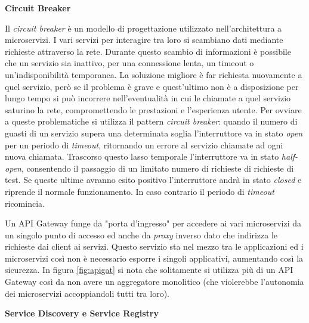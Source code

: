 \begin{flushleft}
\textbf{{\large Circuit Breaker}}
\end{flushleft}

Il \textit{circuit breaker} è un modello di progettazione utilizzato nell'architettura a microservizi. I vari servizi per interagire tra loro si scambiano dati mediante richieste attraverso la rete. Durante questo scambio di informazioni è possibile che un servizio sia inattivo, per una connessione lenta, un timeout o un'indisponibilità temporanea. La soluzione migliore è far richiesta nuovamente a quel servizio, però se il problema è grave e quest'ultimo non è a disposizione per lungo tempo si può incorrere nell'eventualità in cui le chiamate a quel servizio saturino la rete, compromettendo le prestazioni e l'esperienza utente. Per ovviare a queste problematiche si utilizza il \gls{pattern} \textit{circuit breaker}: quando il numero di guasti di un servizio supera una determinata soglia l'interruttore va in stato \textit{open} per un periodo di \textit{timeout}, ritornando un errore al servizio chiamate ad ogni nuova chiamata. Trascorso questo lasso temporale l'interruttore va in stato \textit{half-open}, consentendo il passaggio di un limitato numero di richieste di richieste di test. Se queste ultime avranno esito positivo l'interruttore andrà in stato \textit{closed} e riprende il normale funzionamento. In caso contrario il periodo di \textit{timeout} ricomincia.

Un API Gateway funge da "porta d'ingresso" per accedere ai vari microservizi da un singolo punto di accesso ed anche da \textit{proxy} inverso dato che indirizza le richieste dai client ai servizi. Questo servizio sta nel mezzo tra le applicazioni ed i microservizi così non è necessario esporre i singoli applicativi, aumentando così la sicurezza. In figura \ref{fig:apigat} si nota che solitamente si utilizza più di un API Gateway così da non avere un aggregatore monolitico (che violerebbe l'autonomia dei microservizi accoppiandoli tutti tra loro).

\begin{flushleft}
\textbf{{\large Service Discovery e Service Registry}}
\end{flushleft}

